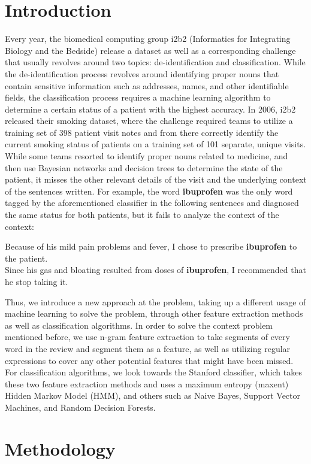 \documentclass[12pt]{article}
\begin{document}
\section{Introduction}
Every year, the biomedical computing group i2b2 (Informatics for Integrating Biology and the Bedside) release a dataset as well as a corresponding challenge that usually revolves around two topics: de-identification and classification. While the de-identification process revolves around identifying proper nouns that contain sensitive information such as addresses, names, and other identifiable fields, the classification process requires a machine learning algorithm to determine a certain status of a patient with the highest accuracy. In 2006, i2b2 released their smoking dataset, where the challenge required teams to utilize a training set of 398 patient visit notes and from there correctly identify the current smoking status of patients on a training set of 101 separate, unique visits. While some teams resorted to identify proper nouns related to medicine, and then use Bayesian networks and decision trees to determine the state of the patient, it misses the other relevant details of the visit and the underlying context of the sentences written. For example, the word \textbf{ibuprofen} was the only word tagged by the aforementioned classifier in the following sentences and diagnosed the same status for both patients, but it fails to analyze the context of the context:
\begin{center}
Because of his mild pain problems and fever, I chose to prescribe \textbf{ibuprofen} to the patient. \\
Since his gas and bloating resulted from doses of \textbf{ibuprofen}, I recommended that he stop taking it.
\end{center}
Thus, we introduce a new approach at the problem, taking up a different usage of machine learning to solve the problem, through other feature extraction methods as well as classification algorithms. In order to solve the context problem mentioned before, we use n-gram feature extraction to take segments of every word in the review and segment them as a feature, as well as utilizing regular expressions to cover any other potential features that might have been missed. For classification algorithms, we look towards the Stanford classifier, which takes these two feature extraction methods and uses a maximum entropy (maxent) Hidden Markov Model (HMM), and others such as Naive Bayes, Support Vector Machines, and Random Decision Forests.
\section{Methodology}
\end{document}
